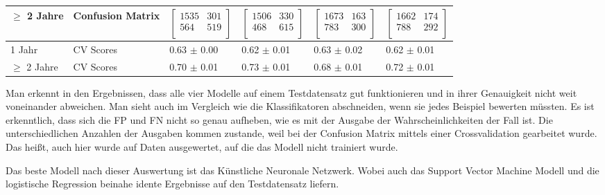 \begin{table}[ht]
\begin{tabular}{ p{2cm} p{2cm} p{2cm} p{2cm} p{2cm} p{2cm} }
    $\geq$ 2 Jahre & Confusion Matrix & $\left[ \begin{array}{rr} 1535 & 301 \\  564 & 519 \\  \end{array}\right]$ & $\left[ \begin{array}{rr} 1506 & 330  \\  468 & 615 \\  \end{array}\right]$ & $\left[ \begin{array}{rr} 1673 & 163  \\  783 & 300 \\  \end{array}\right]$ & $\left[ \begin{array}{rr} 1662 & 174  \\  788 & 292 \\  \end{array}\right]$ \\

    \midrule
    1 Jahr         & CV Scores        & 0.63 $\pm$ 0.00                            & 0.62 $\pm$ 0.01                            & 0.63 $\pm$ 0.02                            & 0.62 $\pm$ 0.01                            \\
    $\geq$ 2 Jahre & CV Scores        & 0.70 $\pm$ 0.01                            & 0.73 $\pm$ 0.01                            & 0.68 $\pm$ 0.01                            & 0.72 $\pm$ 0.01                            \\

    \bottomrule
  \end{tabular}

\end{table}

Man erkennt in den Ergebnissen, dass alle vier Modelle auf einem Testdatensatz gut funktionieren und in ihrer Genauigkeit nicht weit voneinander
abweichen. Man sieht auch im Vergleich wie die Klassifikatoren abschneiden, wenn sie jedes Beispiel bewerten m\"ussten. Es ist erkenntlich, dass sich die FP und FN nicht
so genau aufheben, wie es mit der Ausgabe der Wahrscheinlichkeiten der Fall ist. Die unterschiedlichen Anzahlen der Ausgaben kommen zustande, weil bei der Confusion Matrix
mittels einer Crossvalidation gearbeitet wurde. Das hei{\ss}t, auch hier wurde auf Daten ausgewertet, auf die das Modell nicht trainiert wurde.

Das beste Modell nach dieser Auswertung ist das K\"unstliche Neuronale Netzwerk. Wobei auch das Support Vector Machine Modell und die logistische Regression beinahe
idente Ergebnisse auf den Testdatensatz liefern.







